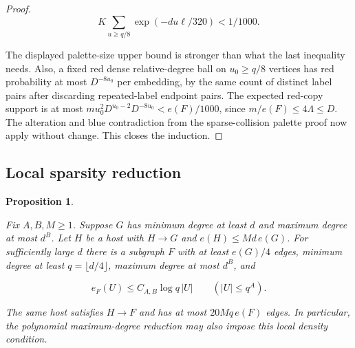 \documentclass[11pt]{amsart}
\newtheorem{proposition}[theorem]{Proposition}
\theoremstyle{definition}
\theoremstyle{remark}
\numberwithin{equation}{section}
\begin{document}
\begin{proof}
\begin{equation}
K\sum_{u\ge q/8}\exp(-du\ell/320)<1/1000.
\end{equation}

The displayed palette-size upper bound is stronger than what the last inequality needs. Also, a fixed red dense relative-degree ball on $u_0\ge q/8$ vertices has red probability at most $ D^{-8u_0}$ per embedding, by the same count of distinct label pairs after discarding repeated-label endpoint pairs. The expected red-copy support is at most $ m u_0^2D^{u_0-2}D^{-8u_0}<e(F)/1000$, since $ m/e(F)\le4\Lambda\le D$. The alteration and blue contradiction from the sparse-collision palette proof now apply without change. This closes the induction.

\end{proof}

\subsection{Local sparsity reduction}

\begin{proposition}\label{prop:local-sparsity}

Fix $A,B,M\ge1$. Suppose $ G $ has minimum degree at least $ d $ and maximum degree at most $ d^B $. Let $H$ be a host with $H\to G$ and $e(H)\le Md\,e(G)$. For sufficiently large $ d $ there is a subgraph $ F $ with at least $ e(G)/4$ edges, minimum degree at least $ q=\lfloor d/4\rfloor $, maximum degree at most $ d^B$, and

\begin{equation}
e_F(U)\le C_{A,B}\log q\,|U|\qquad(|U|\le q^A).
\end{equation}

The same host satisfies $H\to F$ and has at most $20Mq\,e(F)$ edges. In particular, the polynomial maximum-degree reduction may also impose this local density condition.

\end{proposition}
\end{document}
